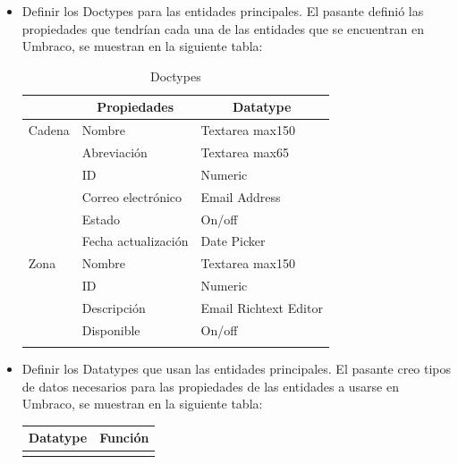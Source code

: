\begin{itemize}
  \item Definir los Doctypes para las entidades principales. El pasante definió las propiedades que tendrían cada una de las entidades que se encuentran en Umbraco, se muestran en la siguiente tabla:
  \begin{longtable}{ | p{5em} | l | l | }
    \hline
    \rowcolor{blue!25}
    \multicolumn{1}{|c|}{Doctype} &
    \multicolumn{1}{|c|}{Propiedades} &
    \multicolumn{1}{|c|}{Datatype} \\
    \hline
    \endhead
 
    \hline
    \endfoot
 
    \endlastfoot
 
    Cadena
        & Nombre & Textarea max150 \\
        \cline{2-3}
        & Abreviación & Textarea max65 \\
        \cline{2-3}
        & ID & Numeric \\
        \cline{2-3}
        & Correo electrónico & Email Address \\
        \cline{2-3}
        & Estado & On/off \\
        \cline{2-3}
        & Fecha actualización & Date Picker \\
    \hline
    Zona 
        & Nombre & Textarea max150 \\
        \cline{2-3}
        & ID & Numeric \\
        \cline{2-3}
        & Descripción & Email Richtext Editor \\
        \cline{2-3}
        & Disponible & On/off \\
    \hline
 
    \caption{Doctypes}
    \label{table:doctypes}
 \end{longtable}
 
  \item Definir los Datatypes que usan las entidades principales. El pasante creo tipos de datos necesarios para las propiedades de las entidades a usarse en Umbraco, se muestran en la siguiente tabla:
  \begin{longtable}{  l | l  }
    \hline\hline
    \rowcolor{blue!25}
    \textbf{Datatype} & \textbf{Función} \\
    \hline\hline
    \endhead
 
    \hline
    \endfoot
 
    \endlastfoot
 

\end{longtable}
\end{itemize}
